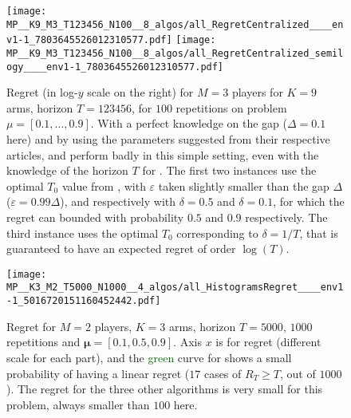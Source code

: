 \begin{figure}[!h]
    \centering
        \texttt{[image: MP\_\_K9\_M3\_T123456\_N100\_\_8\_algos/all\_RegretCentralized\_\_\_\_env1-1\_7803645526012310577.pdf]}
        \texttt{[image: MP\_\_K9\_M3\_T123456\_N100\_\_8\_algos/all\_RegretCentralized\_semilogy\_\_\_\_env1-1\_7803645526012310577.pdf]}
    \caption[Regret for $M=3$ players for $K=9$ arms, horizon $T=123456$, for $100$ repetitions on a fixed problem]{Regret (in log-$y$ scale on the right) for $M=3$ players for $K=9$ arms, horizon $T=123456$, for $100$ repetitions on problem $\mu=[0.1,\dots,0.9]$. With a perfect knowledge on the gap ($\Delta=0.1$ here) and by using the parameters suggested from their respective articles, \MEGA{} and \MusicalChair{} perform badly in this simple setting, even with the knowledge of the horizon $T$ for \MusicalChair{}. The first two \MusicalChair{} instances use the optimal $T_0$ value from \cite{Rosenski16}, with $\varepsilon$ taken slightly smaller than the gap $\Delta$ ($\varepsilon=0.99 \Delta$), and respectively with $\delta=0.5$ and $\delta=0.1$, for which the regret can bounded with probability $0.5$ and $0.9$ respectively. The third instance uses the optimal $T_0$ corresponding to $\delta=1/T$, that is guaranteed to have an expected regret of order $\log(T)$.}
    \label{fig:5:MP__K9_M3_T123456_N100__8_algos}
\end{figure}

%
%
\begin{figure}[!h]
    \centering
        \texttt{[image: MP\_\_K3\_M2\_T5000\_N1000\_\_4\_algos/all\_HistogramsRegret\_\_\_\_env1-1\_5016720151160452442.pdf]}
    \caption[Failure case of \Selfish]{Regret for $M=2$ players, $K=3$ arms, horizon $T=5000$, $1000$ repetitions and $\boldsymbol{\mu} = [0.1, 0.5, 0.9]$. Axis $x$ is for regret (different scale for each part), and the \textcolor{darkgreen}{green} curve for \Selfish{} shows a small probability of having a linear regret ($17$ cases of $R_T \geq T$, out of $1000$). The regret for the three other algorithms is very small for this problem, always smaller than $100$ here.}
    \label{fig:5:selfish_fail1}
\end{figure}


